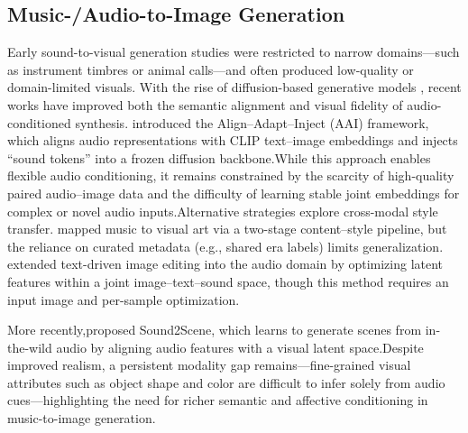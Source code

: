 \documentclass[letterpaper]{article}
\begin{document}
\subsection{Music-/Audio-to-Image Generation}
Early sound-to-visual generation studies \cite{qiu2018sound2visual,chen2017sound2image,oh2019reconstruct,zhou2018visualizingsounds} were restricted to narrow domains—such as instrument timbres or animal calls—and often produced low-quality or domain-limited visuals.
With the rise of diffusion-based generative models \cite{kong2023audiodm}, recent works have improved both the semantic alignment and visual fidelity of audio-conditioned synthesis. \cite{yang2023align}introduced the Align–Adapt–Inject (AAI) framework, which aligns audio representations with CLIP text–image embeddings and injects “sound tokens” into a frozen diffusion backbone.While this approach enables flexible audio conditioning, it remains constrained by the scarcity of high-quality paired audio–image data and the difficulty of learning stable joint embeddings for complex or novel audio inputs.Alternative strategies explore cross-modal style transfer. \cite{lee2020crossing}mapped music to visual art via a two-stage content–style pipeline, but the reliance on curated metadata (e.g., shared era labels) limits generalization. \cite{2024Robust}extended text-driven image editing into the audio domain by optimizing latent features within a joint image–text–sound space, though this method requires an input image and per-sample optimization.

More recently,\cite{kim2023sound2scene}proposed Sound2Scene, which learns to generate scenes from in-the-wild audio by aligning audio features with a visual latent space.Despite improved realism, a persistent modality gap remains—fine-grained visual attributes such as object shape and color are difficult to infer solely from audio cues—highlighting the need for richer semantic and affective conditioning in music-to-image generation.
\end{document}
